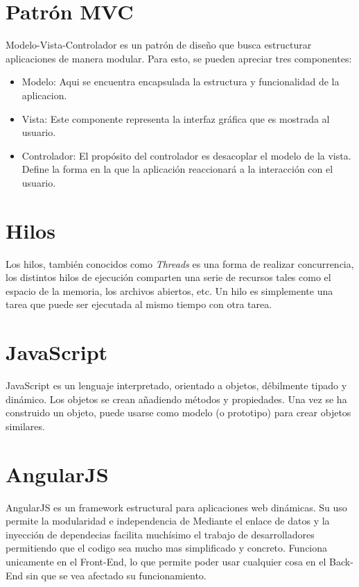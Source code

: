 \section{Patrón MVC} \label{sect:MVC}
Modelo-Vista-Controlador es un patrón de diseño que busca estructurar aplicaciones de manera modular.\cite{MVC} Para esto, se pueden apreciar tres componentes:
\begin{itemize}[noitemsep,nolistsep]
\item Modelo: Aqui se encuentra encapsulada la estructura y funcionalidad de la aplicacion.
\item Vista: Este componente representa la interfaz gráfica que es mostrada al usuario.
\item Controlador: El propósito del controlador es desacoplar el modelo de la vista. Define la forma en la que la aplicación reaccionará a la interacción con el usuario.\end{itemize}

\section{Hilos} \label{sect:Hilos}
Los hilos, también conocidos como \textit{Threads} es una forma de
realizar concurrencia, los distintos hilos de ejecución comparten una serie de recursos tales como el espacio de la memoria, los archivos abiertos, etc. Un hilo es simplemente una tarea que puede ser ejecutada al mismo tiempo con otra tarea.\cite{hilo}

\section{JavaScript} \label{sect:JS}
JavaScript es un lenguaje interpretado, orientado a objetos, débilmente tipado
y dinámico. Los objetos se crean añadiendo métodos y propiedades. Una vez se ha construido un objeto, puede usarse como modelo (o prototipo) para crear objetos similares.\cite{JS}


\section{AngularJS} \label{sect:AJS}
AngularJS es un framework estructural para aplicaciones web dinámicas. Su
uso permite la modularidad e independencia de Mediante el enlace de datos y la inyección de dependecias facilita muchísimo el trabajo de desarrolladores permitiendo que el codigo sea mucho mas simplificado y concreto. Funciona unicamente en el Front-End, lo que permite poder usar cualquier cosa en el Back-End sin que se vea afectado su funcionamiento. 

